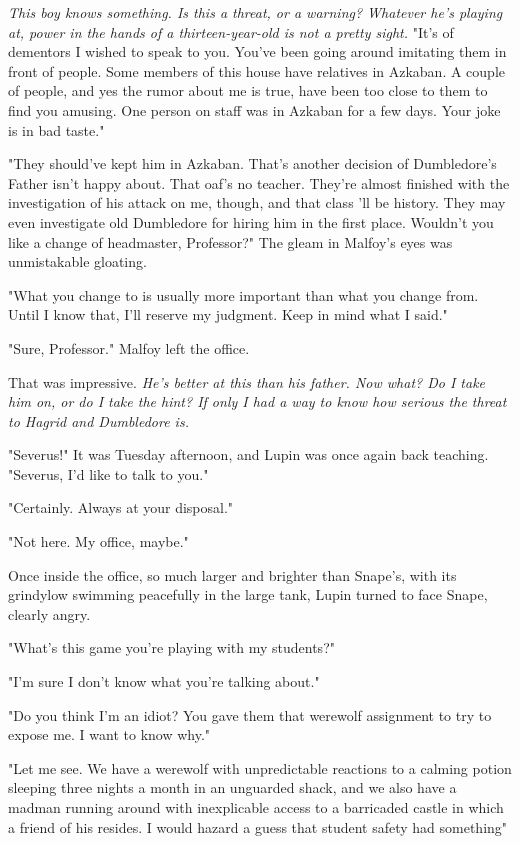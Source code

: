 \emph{This boy knows something. Is this a threat, or a warning? Whatever he's playing at, power in the hands of a thirteen-year-old is not a pretty sight.} "It's of dementors I wished to speak to you. You've been going around imitating them in front of people. Some members of this house have relatives in Azkaban. A couple of people, and yes the rumor about me is true, have been too close to them to find you amusing. One person on staff was in Azkaban for a few days. Your joke is in bad taste."

"They should've kept him in Azkaban. That's another decision of Dumbledore's Father isn't happy about. That oaf's no teacher. They're almost finished with the investigation of his attack on me, though, and that class 'll be history. They may even investigate old Dumbledore for hiring him in the first place. Wouldn't you like a change of headmaster, Professor?" The gleam in Malfoy's eyes was unmistakable gloating.

"What you change to is usually more important than what you change from. Until I know that, I'll reserve my judgment. Keep in mind what I said."

"Sure, Professor." Malfoy left the office.

That was impressive. \emph{He's better at this than his father. Now what? Do I take him on, or do I take the hint? If only I had a way to know how serious the threat to Hagrid and Dumbledore is.}

\sbreak

"Severus!" It was Tuesday afternoon, and Lupin was once again back teaching. "Severus, I'd like to talk to you."

"Certainly. Always at your disposal."

"Not here. My office, maybe."

Once inside the office, so much larger and brighter than Snape's, with its grindylow swimming peacefully in the large tank, Lupin turned to face Snape, clearly angry.

"What's this game you're playing with my students?"

"I'm sure I don't know what you're talking about."

"Do you think I'm an idiot? You gave them that werewolf assignment to try to expose me. I want to know why."

"Let me see. We have a werewolf with unpredictable reactions to a calming potion sleeping three nights a month in an unguarded shack, and we also have a madman running around with inexplicable access to a barricaded castle in which a friend of his resides. I would hazard a guess that student safety had something{\el}"

